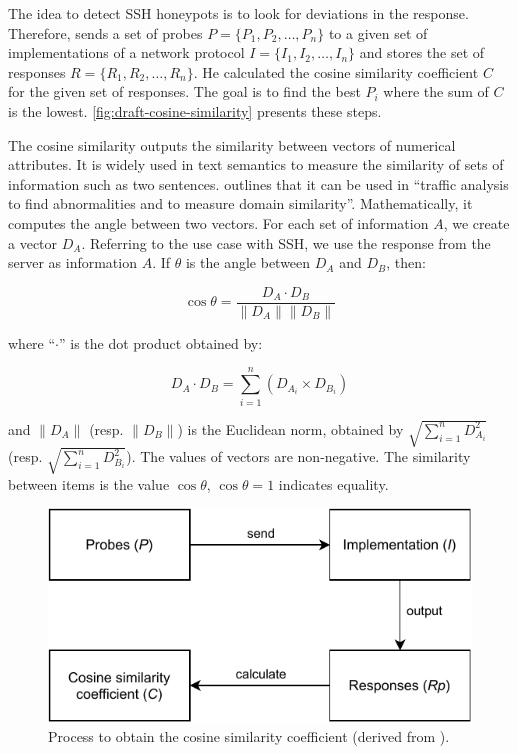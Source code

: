 The idea to detect SSH honeypots is to look for deviations in the response.
Therefore, \citet{vetterl2020} sends a set of probes $P = \{P_1, P_2, \dots, P_n\}$ to a given set of implementations of a network protocol $I = \{I_1, I_2, \dots, I_n\}$ and stores the set of responses $R = \{R_1, R_2, \dots, R_n\}$.
He calculated the cosine similarity coefficient $C$ for the given set of responses.
The goal is to find the best $P_i$ where the sum of $C$ is the lowest.
\autoref{fig:draft-cosine-similarity} presents these steps.

The cosine similarity outputs the similarity between vectors of numerical attributes.
It is widely used in text semantics to measure the similarity of sets of information such as two sentences.
\citet{vetterl2020} outlines that it can be used in \enquote{traffic analysis to find abnormalities and to measure domain similarity}.
Mathematically, it computes the angle between two vectors.
For each set of information $A$, we create a vector $D_A$.
Referring to the use case with SSH, we use the response from the server as information $A$.
If $\theta$ is the angle between $D_A$ and $D_B$, then:

\begin{equation} \label{eq:cosine-similarity}
    \cos \theta = \frac{D_A \cdot D_B}{\|D_A\| \|D_B\|}
\end{equation}

where \enquote{$\cdot$} is the dot product obtained by:

\begin{equation}
    D_A \cdot D_B = \sum_{i=1}^{n} (D_{A_i} \times D_{B_i})
\end{equation}

and $\|D_A\|$ (resp. $\|D_B\|$) is the Euclidean norm, obtained by $\sqrt{\sum_{i=1}^{n} D_{A_i}^2}$ (resp. $\sqrt{\sum_{i=1}^{n} D_{B_i}^2}$).
The values of vectors are non-negative.
The similarity between items is the value $\cos \theta$, $\cos \theta = 1$ indicates equality.

\begin{figure}[htbp]
    \centering
    \includegraphics{figures/vetterl_concept.pdf}
    \caption[Process to obtain the cosine similarity coefficient]{
        Process to obtain the cosine similarity coefficient (derived from \cite{vetterl2020}).
    }
    \label{fig:draft-cosine-similarity}
\end{figure}

